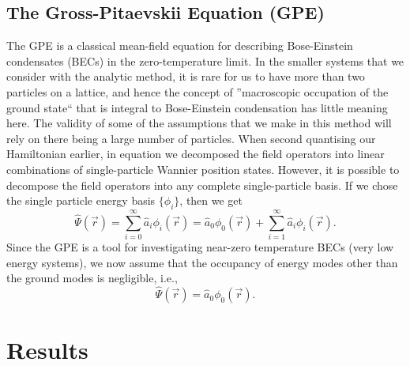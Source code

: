 \documentclass[a4paper,10pt]{article}
\begin{document}
\subsection{The Gross-Pitaevskii Equation (GPE)}
The GPE is a classical mean-field equation for describing Bose-Einstein condensates (BECs) in the zero-temperature limit. In the smaller systems that we consider with the analytic method, it is rare
for us to have more than two particles on a lattice, and hence the concept of ''macroscopic occupation of the ground state`` that is integral to Bose-Einstein condensation has little meaning here.
The validity of some of the assumptions that we make in this method will rely on there being a large number of particles. 
When second quantising our Hamiltonian earlier, in equation \label{field_operators_wannier} we decomposed the field operators into linear combinations of single-particle Wannier position states. 
However, it is possible to decompose the field operators into any complete single-particle basis. If we chose the single particle energy basis $\{\phi_i\}$, then we get
\begin{equation}
 \hat{\Psi}(\vec{r})=\sum_{i=0}^\infty \hat{a}_i\phi_{i}(\vec{r}) = \hat{a}_0\phi_{0}(\vec{r}) + \sum_{i=1}^\infty \hat{a}_i\phi_{i}(\vec{r}).
\end{equation}
Since the GPE is a tool for investigating near-zero temperature BECs (very low energy systems), we now assume that the occupancy of energy modes other than the ground modes is negligible, i.e.,
\begin{equation}
 \hat{\Psi}(\vec{r})=\hat{a}_0\phi_{0}(\vec{r}).
\end{equation}


\newpage
\section{Results}
\end{document}
